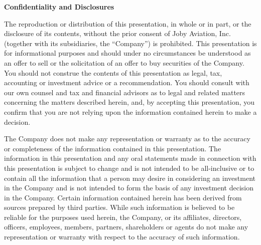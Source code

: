 
\textbf{Confidentiality and Disclosures}\par\nobreak
The reproduction or distribution of this presentation, in whole or in part, or the disclosure of its contents, without the prior consent of Joby Aviation, Inc. (together with its subsidiaries, the ``Company'') is prohibited. This presentation is for informational purposes and should under no circumstances be understood as an offer to sell or the solicitation of an offer to buy securities of the Company. You should not construe the contents of this presentation as legal, tax, accounting or investment advice or a recommendation. You should consult with our own counsel and tax and financial advisors as to legal and related matters concerning the matters described herein, and, by accepting this presentation, you confirm that you are not relying upon the information contained herein to make a decision.\par
\medskip
The Company does not make any representation or warranty as to the accuracy or completeness of the information contained in this presentation. The information in this presentation and any oral statements made in connection with this presentation is subject to change and is not intended to be all-inclusive or to contain all the information that a person may desire in considering an investment in the Company and is not intended to form the basis of any investment decision in the Company. Certain information contained herein has been derived from sources prepared by third parties. While such information is believed to be reliable for the purposes used herein, the Company, or its affiliates, directors, officers, employees, members, partners, shareholders or agents do not make any representation or warranty with respect to the accuracy of such information.\par
\bigskip

